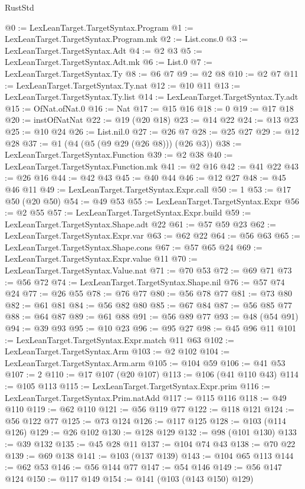 \begin{lexlean}{RustStd}
\begin{coremodule}
@0 := LexLeanTarget.TargetSyntax.Program
@1 := LexLeanTarget.TargetSyntax.Program.mk
@2 := List.cons.{0}
@3 := LexLeanTarget.TargetSyntax.Adt
@4 := @2 @3
@5 := LexLeanTarget.TargetSyntax.Adt.mk
@6 := List.{0}
@7 := LexLeanTarget.TargetSyntax.Ty
@8 := @6 @7
@9 := @2 @8
@10 := @2 @7
@11 := LexLeanTarget.TargetSyntax.Ty.nat
@12 := @10 @11
@13 := LexLeanTarget.TargetSyntax.Ty.list
@14 := LexLeanTarget.TargetSyntax.Ty.adt
@15 := OfNat.ofNat.{0}
@16 := Nat
@17 := @15 @16
@18 := 0
@19 := @17 @18
@20 := instOfNatNat
@22 := @19 (@20 @18)
@23 := @14 @22
@24 := @13 @23
@25 := @10 @24
@26 := List.nil.{0}
@27 := @26 @7
@28 := @25 @27
@29 := @12 @28
@37 := @1 (@4 (@5 (@9 @29 (@26 @8))) (@26 @3))
@38 := LexLeanTarget.TargetSyntax.Function
@39 := @2 @38
@40 := LexLeanTarget.TargetSyntax.Function.mk
@41 := @2 @16
@42 := @41 @22
@43 := @26 @16
@44 := @42 @43
@45 := @40 @44
@46 := @12 @27
@48 := @45 @46 @11
@49 := LexLeanTarget.TargetSyntax.Expr.call
@50 := 1
@53 := @17 @50 (@20 @50)
@54 := @49 @53
@55 := LexLeanTarget.TargetSyntax.Expr
@56 := @2 @55
@57 := LexLeanTarget.TargetSyntax.Expr.build
@59 := LexLeanTarget.TargetSyntax.Shape.adt @22
@61 := @57 @59 @23
@62 := LexLeanTarget.TargetSyntax.Expr.var
@63 := @62 @22
@64 := @56 @63
@65 := LexLeanTarget.TargetSyntax.Shape.cons
@67 := @57 @65 @24
@69 := LexLeanTarget.TargetSyntax.Expr.value @11
@70 := LexLeanTarget.TargetSyntax.Value.nat
@71 := @70 @53
@72 := @69 @71
@73 := @56 @72
@74 := LexLeanTarget.TargetSyntax.Shape.nil
@76 := @57 @74 @24
@77 := @26 @55
@78 := @76 @77
@80 := @56 @78 @77
@81 := @73 @80
@82 := @61 @81
@84 := @56 @82 @80
@85 := @67 @84
@87 := @56 @85 @77
@88 := @64 @87
@89 := @61 @88
@91 := @56 @89 @77
@93 := @48 (@54 @91)
@94 := @39 @93
@95 := @10 @23
@96 := @95 @27
@98 := @45 @96 @11
@101 := LexLeanTarget.TargetSyntax.Expr.match @11 @63
@102 := LexLeanTarget.TargetSyntax.Arm
@103 := @2 @102
@104 := LexLeanTarget.TargetSyntax.Arm.arm
@105 := @104 @59
@106 := @41 @53
@107 := 2
@110 := @17 @107 (@20 @107)
@113 := @106 (@41 @110 @43)
@114 := @105 @113
@115 := LexLeanTarget.TargetSyntax.Expr.prim
@116 := LexLeanTarget.TargetSyntax.Prim.natAdd
@117 := @115 @116
@118 := @49 @110
@119 := @62 @110
@121 := @56 @119 @77
@122 := @118 @121
@124 := @56 @122 @77
@125 := @73 @124
@126 := @117 @125
@128 := @103 (@114 @126)
@129 := @26 @102
@130 := @128 @129
@132 := @98 (@101 @130)
@133 := @39 @132
@135 := @45 @28 @11
@137 := @104 @74 @43
@138 := @70 @22
@139 := @69 @138
@141 := @103 (@137 @139)
@143 := @104 @65 @113
@144 := @62 @53
@146 := @56 @144 @77
@147 := @54 @146
@149 := @56 @147 @124
@150 := @117 @149
@154 := @141 (@103 (@143 @150) @129)

\end{coremodule}
\end{lexlean}

